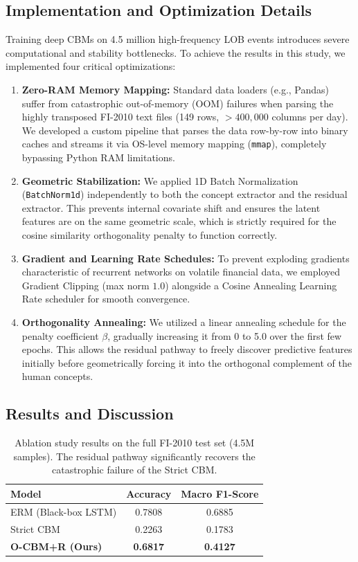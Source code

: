 \documentclass[twoside,11pt]{article}
\begin{document}
\subsection{Implementation and Optimization Details}
Training deep CBMs on 4.5 million high-frequency LOB events introduces severe computational and stability bottlenecks. To achieve the results in this study, we implemented four critical optimizations:
\begin{enumerate}
    \item \textbf{Zero-RAM Memory Mapping:} Standard data loaders (e.g., Pandas) suffer from catastrophic out-of-memory (OOM) failures when parsing the highly transposed FI-2010 text files (149 rows, $>400,000$ columns per day). We developed a custom pipeline that parses the data row-by-row into binary caches and streams it via OS-level memory mapping (\texttt{mmap}), completely bypassing Python RAM limitations.
    \item \textbf{Geometric Stabilization:} We applied 1D Batch Normalization (\texttt{BatchNorm1d}) independently to both the concept extractor and the residual extractor. This prevents internal covariate shift and ensures the latent features are on the same geometric scale, which is strictly required for the cosine similarity orthogonality penalty to function correctly.
    \item \textbf{Gradient and Learning Rate Schedules:} To prevent exploding gradients characteristic of recurrent networks on volatile financial data, we employed Gradient Clipping (max norm $1.0$) alongside a Cosine Annealing Learning Rate scheduler for smooth convergence.
    \item \textbf{Orthogonality Annealing:} We utilized a linear annealing schedule for the penalty coefficient $\beta$, gradually increasing it from 0 to 5.0 over the first few epochs. This allows the residual pathway to freely discover predictive features initially before geometrically forcing it into the orthogonal complement of the human concepts.
\end{enumerate}

\subsection{Results and Discussion}

\begin{table}[h]
\centering
\begin{tabular}{lcc}
\hline
\textbf{Model} & \textbf{Accuracy} & \textbf{Macro F1-Score} \\
\hline
ERM (Black-box LSTM) & 0.7808 & 0.6885 \\
Strict CBM & 0.2263 & 0.1783 \\
\textbf{O-CBM+R (Ours)} & \textbf{0.6817} & \textbf{0.4127} \\
\hline
\end{tabular}
\caption{Ablation study results on the full FI-2010 test set (4.5M samples). The residual pathway significantly recovers the catastrophic failure of the Strict CBM.}
\label{tab:results}
\end{table}
\end{document}
